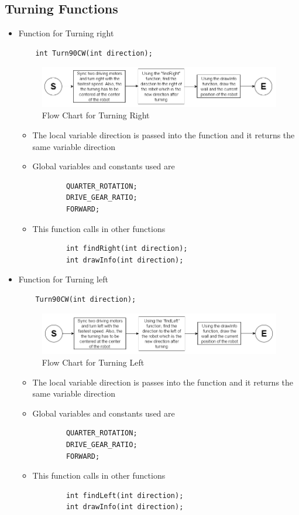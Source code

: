 \documentclass[11pt]{article}
\begin{document}

\subsection{Turning Functions}
\begin{itemize}
\item Function for Turning right
\begin{verbatim}
	int Turn90CW(int direction);
\end{verbatim}
\begin{figure}[htp]
\centering
\includegraphics[scale=0.6]{images/Software_Flowchart/Turning_Right.png}
\caption{Flow Chart for Turning Right}
\label{}
\end{figure}
	\begin{itemize}
	\item The local variable direction is passed into the function and it returns the same variable direction
	\item Global variables and constants used are
	\begin{verbatim}
		QUARTER_ROTATION;
		DRIVE_GEAR_RATIO;
		FORWARD;
	\end{verbatim}
	\item This function calls in other functions
	\begin{verbatim}
		int findRight(int direction);
		int drawInfo(int direction);
	\end{verbatim}
	\end{itemize}
\item Function for Turning left 
\begin{verbatim}
	Turn90CW(int direction);
\end{verbatim}
\begin{figure}[htp]
\centering
\includegraphics[scale=0.60]{images/Software_Flowchart/Turning_Left.png}
\caption{Flow Chart for Turning Left}
\label{}
\end{figure}
	\begin{itemize}
	\item The local variable direction is passes into the function and it returns the same variable direction
	\item Global variables and constants used are
	\begin{verbatim}
		QUARTER_ROTATION;
		DRIVE_GEAR_RATIO;
		FORWARD;
	\end{verbatim}
	\item This function calls in other functions
	\begin{verbatim}
		int findLeft(int direction);
		int drawInfo(int direction);
	\end{verbatim}
	\end{itemize}
\end{itemize}
\end{document}
